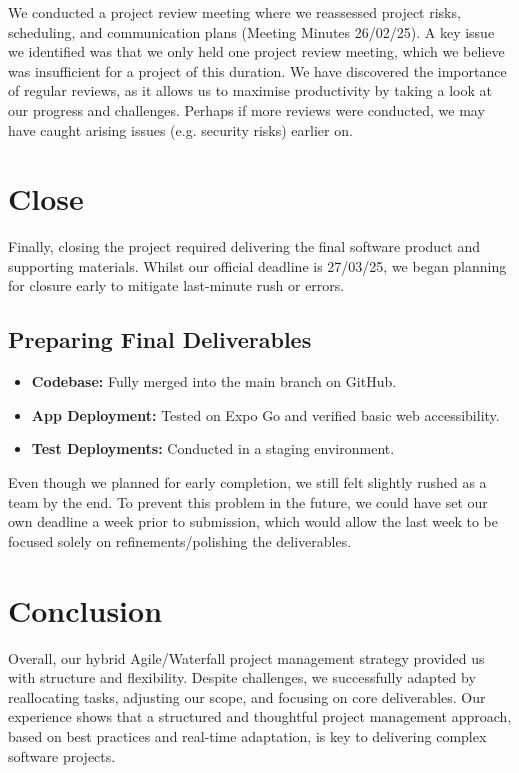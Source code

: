 We conducted a project review meeting where we reassessed project risks, scheduling, and communication plans (Meeting Minutes 26/02/25). A key issue we identified was that we only held one project review meeting, which we believe was insufficient for a project of this duration. We have discovered the importance of regular reviews, as it allows us to maximise productivity by taking a look at our progress and challenges. Perhaps if more reviews were conducted, we may have caught arising issues (e.g. security risks) earlier on.

\section{Close}
Finally, closing the project required delivering the final software product and supporting materials. Whilst our official deadline is 27/03/25, we began planning for closure early to mitigate last-minute rush or errors.

\subsection{Preparing Final Deliverables}
\begin{itemize}
    \item \textbf{Codebase:} Fully merged into the main branch on GitHub.
    \item \textbf{App Deployment:} Tested on Expo Go and verified basic web accessibility.
    \item \textbf{Test Deployments:} Conducted in a staging environment.
\end{itemize}

Even though we planned for early completion, we still felt slightly rushed as a team by the end. To prevent this problem in the future, we could have set our own deadline a week prior to submission, which would allow the last week to be focused solely on refinements/polishing the deliverables.

\section{Conclusion}
Overall, our hybrid Agile/Waterfall project management strategy provided us with structure and flexibility. Despite challenges, we successfully adapted by reallocating tasks, adjusting our scope, and focusing on core deliverables. Our experience shows that a structured and thoughtful project management approach, based on best practices and real-time adaptation, is key to delivering complex software projects.






